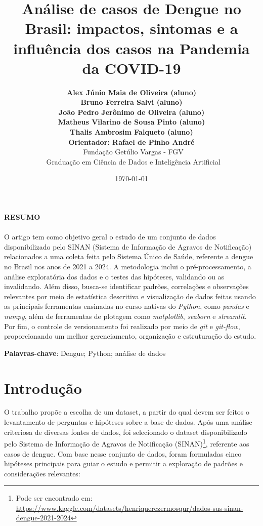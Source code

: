 \documentclass[a4paper,12pt]{article}
\title{\textbf{Análise de casos de Dengue no Brasil: impactos, sintomas e a influência dos casos na Pandemia da COVID-19}}
\author{
    \normalsize
    \textbf{Alex Júnio Maia de Oliveira (aluno)} \\ 
    \normalsize
    \textbf{Bruno Ferreira  Salvi (aluno)} \\
    \normalsize
    \textbf{João Pedro Jerônimo de Oliveira (aluno)} \\
    \normalsize
    \textbf{Matheus Vilarino de Sousa Pinto (aluno)} \\
    \normalsize
    \textbf{Thalis Ambrosim Falqueto (aluno)} \\
    \normalsize
    \textbf{Orientador: Rafael de Pinho André} \\
    \normalsize
    \ Fundação Getúlio Vargas - FGV \\
    \normalsize
    \ Graduação em Ciência de Dados e Inteligência Artificial
}
\date {\today}
\begin{document}
\maketitle

\noindent\textbf{RESUMO} \\ \\O artigo tem como objetivo geral o estudo de um conjunto de dados disponibilizado pelo SINAN (Sistema de Informação de Agravos de Notificação) relacionados a uma coleta feita pelo Sistema Único de Saúde, referente a dengue no Brasil nos anos de 2021 a 2024. A metodologia inclui o pré-processamento, a análise exploratória dos dados e o testes das hipóteses, validando ou as invalidando.  Além disso, busca-se identificar padrões, correlações e observações relevantes por meio de estatística descritiva e visualização de dados feitas usando as principais ferramentas ensinadas no curso nativas do \emph{Python}, como \emph{pandas} e \emph{numpy}, além de ferramentas de plotagem como \emph{matplotlib}, \emph{seaborn} e \emph{streamlit}. Por fim, o controle de versionamento foi realizado por meio de \emph{git} e \emph{git-flow}, proporcionando um melhor gerenciamento, organização e estruturação do estudo.

\vspace{0.5cm}

\noindent\textbf{Palavras-chave}: Dengue; Python; análise de dados

\section{Introdução}
O trabalho propõe a escolha de um dataset, a partir do qual devem ser feitos o levantamento de perguntas e hipóteses sobre a base de dados. Após uma análise criteriosa de diversas fontes de dados, foi selecionado o dataset disponibilizado pelo Sistema de Informação de Agravos de Notificação (SINAN)\footnote{Pode ser encontrado em: \url{https://www.kaggle.com/datasets/henriquerezermosqur/dados-sus-sinan-dengue-2021-2024}}, referente aos casos de dengue. Com base nesse conjunto de dados, foram formuladas cinco hipóteses principais para guiar o estudo e permitir a exploração de padrões e considerações relevantes:
\end{document}
